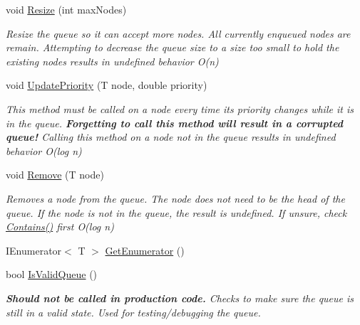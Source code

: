 \begin{DoxyCompactItemize}
void \hyperlink{class_priority___queue_1_1_fast_priority_queue_a6e765b7a118ec3c56a092a058ec987c1}{Resize} (int max\+Nodes)
\begin{DoxyCompactList}\small\item\em Resize the queue so it can accept more nodes. All currently enqueued nodes are remain. Attempting to decrease the queue size to a size too small to hold the existing nodes results in undefined behavior O(n) \end{DoxyCompactList}\item 
void \hyperlink{class_priority___queue_1_1_fast_priority_queue_a6a264392ba7d522df490170facc1f252}{Update\+Priority} (T node, double priority)
\begin{DoxyCompactList}\small\item\em This method must be called on a node every time its priority changes while it is in the queue. {\bfseries Forgetting to call this method will result in a corrupted queue!} Calling this method on a node not in the queue results in undefined behavior O(log n) \end{DoxyCompactList}\item 
void \hyperlink{class_priority___queue_1_1_fast_priority_queue_ac4b7f14c5114cc676537d80168679698}{Remove} (T node)
\begin{DoxyCompactList}\small\item\em Removes a node from the queue. The node does not need to be the head of the queue. If the node is not in the queue, the result is undefined. If unsure, check \hyperlink{class_priority___queue_1_1_fast_priority_queue_ac7ed1c55afc22b9f492576675d0651c7}{Contains()} first O(log n) \end{DoxyCompactList}\item 
I\+Enumerator$<$ T $>$ \hyperlink{class_priority___queue_1_1_fast_priority_queue_a6bc93c974be3bd97fbce99478a2bca46}{Get\+Enumerator} ()
\item 
bool \hyperlink{class_priority___queue_1_1_fast_priority_queue_ae0ac5139a5b545e75808a4173a8777d6}{Is\+Valid\+Queue} ()
\begin{DoxyCompactList}\small\item\em {\bfseries Should not be called in production code.} Checks to make sure the queue is still in a valid state. Used for testing/debugging the queue. \end{DoxyCompactList}\end{DoxyCompactItemize}
